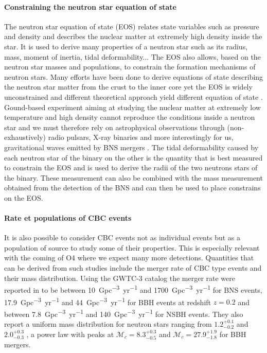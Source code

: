 \paragraph*{Constraining the neutron star equation of state}
\label{sec:EOS}
The neutron star equation of state (EOS) relates state variables such as pressure and density and describes the nuclear matter at extremely high density inside the star.
It is used to derive many properties of a neutron star such as its radius, mass, moment of inertia, tidal deformability...
The EOS also allows, based on the neutron star masses and populations, to constrain the formation mechanisms of neutron stars.
Many efforts have been done to derive equations of state describing the neutron star matter from the crust to the inner core yet the EOS is widely unconstrained and different theoretical approach yield different equation of state \cite{EOS_Douchin_2001,EOS_Lattimer_2001}.
Gound-based experiment aiming at studying the nuclear matter at extremely low temperature and high density cannot reproduce the conditions inside a neutron star and we must therefore rely on astrophysical observations through (non-exhaustively) radio pulsars, X-ray binaries and more interestingly for us, gravitational waves emitted by BNS mergers \cite{EOS_gw170817,EOS_pulsar,EOS_Lattimer_2021}.
The tidal deformability caused by each neutron star of the binary on the other is the quantity that is best measured to constrain the EOS and is used to derive the radii of the two neutrons stars of the binary.
These measurement can also be combined with the mass measurement obtained from the detection of the BNS and can then be used to place constrains on the EOS.

\paragraph*{Rate et populations of CBC events}
\label{sec:rateNpop}
It is also possible to consider CBC events not as individual events but as a population of source to study some of their properties.
This is especially relevant with the coming of O4 where we expect many more detections.
Quantities that can be derived from such studies include the merger rate of CBC type events and their mass distribution.
Using the GWTC-3 catalog \cite{gwtc3} the merger rate were reported in \cite{rate_and_pop} to be between \SI{10}{Gpc^{-3}.yr^{-1}} and \SI{1700}{Gpc^{-3}.yr^{-1}} for BNS events, \SI{17.9}{Gpc^{-3}.yr^{-1}} and \SI{44}{Gpc^{-3}.yr^{-1}} for BBH events at redshift $z=0.2$ and between \SI{7.8}{Gpc^{-3}.yr^{-1}} and \SI{140}{Gpc^{-3}.yr^{-1}} for NSBH events.
They also report a uniform mass distribution for neutron stars ranging from $1.2^{+0.1}_{-0.2}$ \msun and $2.0^{+0.3}_{-0.3}$ \msun, a power law with peaks at $\mathcal{M}_{c} = 8.3^{+0.3}_{-0.5}$ \msun and $\mathcal{M}_{c} = 27.9^{+1.9}_{-1.8}$ for BBH mergers.

